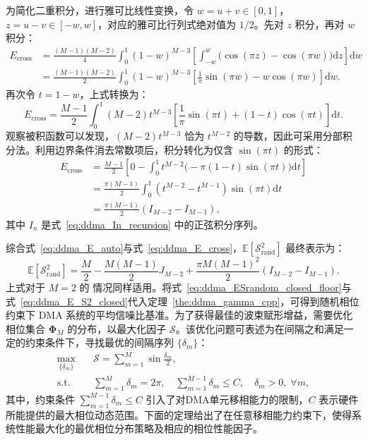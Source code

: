 为简化二重积分，进行雅可比线性变换，令 $w = u+v \in [0,1]$，$z = u-v \in [-w, w]$，对应的雅可比行列式绝对值为 $1/2$。先对 $z$ 积分，再对 $w$ 积分：
\begin{align}
	E_{\text{cross}} &= \frac{(M-1)(M-2)}{4} \int_0^1 (1-w)^{M-3} \left[ \int_{-w}^w \big( \cos(\pi z) - \cos(\pi w) \big) \mathrm{d}z \right] \mathrm{d}w \nonumber \\
	&= \frac{(M-1)(M-2)}{2} \int_0^1 (1-w)^{M-3} \left[ \frac{1}{\pi}\sin(\pi w) - w\cos(\pi w) \right] \mathrm{d}w.
\end{align}
再次令 $t = 1-w$，上式转换为：
\begin{equation}
	E_{\text{cross}} = \frac{M-1}{2} \int_0^1 (M-2)t^{M-3} \left[ \frac{1}{\pi}\sin(\pi t) + (1-t)\cos(\pi t) \right] \mathrm{d}t.
\end{equation}
观察被积函数可以发现，$(M-2)t^{M-3}$ 恰为 $t^{M-2}$ 的导数，因此可采用分部积分法。利用边界条件消去常数项后，积分转化为仅含 $\sin(\pi t)$ 的形式：
\begin{align}
	E_{\text{cross}} &= \frac{M-1}{2} \left[ 0 - \int_0^1 t^{M-2} \big( -\pi(1-t)\sin(\pi t) \big) \mathrm{d}t \right] \nonumber \\
	&= \frac{\pi(M-1)}{2} \int_0^1 \left( t^{M-2} - t^{M-1} \right) \sin(\pi t) \mathrm{d}t \nonumber \\
	&= \frac{\pi(M-1)}{2} \left( I_{M-2} - I_{M-1} \right), \label{eq:ddma_E_cross}
\end{align}
其中 $I_n$ 是式~\eqref{eq:ddma_In_recursion} 中的正弦积分序列。

综合式~\eqref{eq:ddma_E_auto}与式~\eqref{eq:ddma_E_cross}，$\mathbb{E}[\mathcal{S}_{\text{rand}}^2]$ 最终表示为：
\begin{equation}\label{eq:ddma_E_S2_closed}
	\mathbb{E}[\mathcal{S}_{\text{rand}}^2] = \frac{M}{2} - \frac{M(M-1)}{2} J_{M-2} + \frac{\pi M(M-1)^2}{2} (I_{M-2} - I_{M-1}).
\end{equation}
上式对于 $M=2$ 的 情况同样适用。将式~\eqref{eq:ddma_ESrandom_closed_floor}与式~\eqref{eq:ddma_E_S2_closed}代入定理~\ref{the:ddma_gamma_cpp}，可得到随机相位约束下 DMA 系统的平均信噪比基准。为了获得最佳的波束赋形增益，需要优化相位集合 $\bm \Phi_M$ 的分布，以最大化因子 $\mathcal{S}$。该优化问题可表述为在间隔之和满足一定的约束条件下，寻找最优的间隔序列 $\{\delta_m\}$：
\begin{align}\label{eq:ddma_opt_phase_question}
	\max_{\{\delta_m\}} \quad & \mathcal{S} = \sum_{m=1}^M \sin \frac{\delta_m}{2}, \\ 
	\text{s.t.} \quad & \sum_{m=1}^M \delta_m = 2\pi, \quad
	\sum_{m=1}^{M-1} \delta_m\le C, \quad
	\delta_m > 0, \; \forall m,
\end{align}
其中，约束条件 $\sum_{m=1}^{M-1} \delta_m \le C$ 引入了对DMA单元移相能力的限制，$C$ 表示硬件所能提供的最大相位动态范围。下面的定理给出了在任意移相能力约束下，使得系统性能最大化的最优相位分布策略及相应的相位性能因子。

